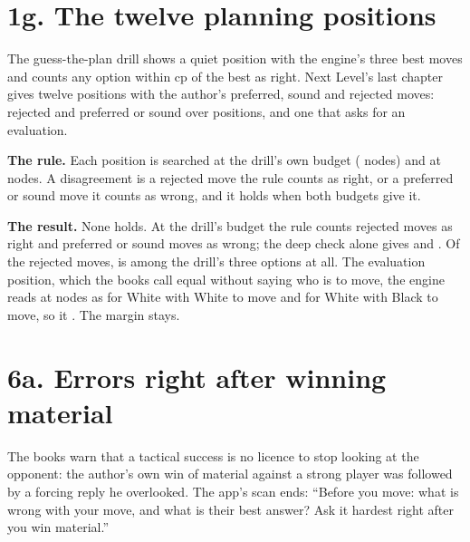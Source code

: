 \documentclass[11pt]{article}
\begin{document}
\begin{table}[h]
\centering
\scriptsize\ConversionTable
\caption{The conversion goals and the tripwire, the band each is read from, and what it moves to.}
\label{tab:conversion}
\end{table}

\section{1g. The twelve planning positions}

The guess-the-plan drill shows a quiet position with the engine's three best moves and counts any
option within \PlanMargin{} cp of the best as right. Next Level's last chapter gives twelve positions
with the author's preferred, sound and rejected moves: \PlanRejected{} rejected and \PlanSound{}
preferred or sound over \PlanPositions{} positions, and one that asks for an evaluation.

\textbf{The rule.} Each position is searched at the drill's own budget (\PlanNodes{} nodes) and at
\DeepNodes{} nodes. A
disagreement is a rejected move the rule counts as right, or a preferred or sound move it counts as
wrong, and it holds when both budgets give it.

\textbf{The result.} None holds. At the drill's budget the rule counts \PlanRejectedRightPlan{}
rejected moves as right and \PlanSoundWrongPlan{} preferred or sound moves as wrong; the deep check
alone gives \PlanRejectedRightDeep{} and \PlanSoundWrongDeep. Of the rejected moves,
\PlanRejectedTopThree{} is among the drill's three options at all. The evaluation position, which the books call equal
without saying who is to move, the engine reads at \DeepNodes{} nodes as \PlanEvalWhite{} for White
with White to move and \PlanEvalBlack{} for White with Black to move, so it \PlanEvalAgreement. The
margin stays.

\section{6a. Errors right after winning material}

The books warn that a tactical success is no licence to stop looking at the opponent: the author's own
win of material against a strong player was followed by a forcing reply he overlooked. The app's
scan ends: ``Before you move: what is wrong with your move, and what is their best answer? Ask it
hardest right after you win material.''
\end{document}
